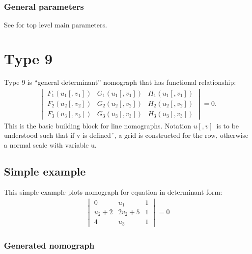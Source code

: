 \documentclass[a4paper,11pt,english]{sphinxmanual}
\begin{document}
\subsubsection{General parameters}
\label{\detokenize{types/types:id39}}
See {\hyperref[\detokenize{main_params:main-params}]{}} for top level main parameters.


\section{Type 9}
\label{\detokenize{types/types:type-9}}\label{\detokenize{types/types:type9-ref}}
Type 9 is “general determinant” nomograph that has functional
relationship:
\begin{equation*}
\begin{split}\begin{vmatrix}
F_1(u_1[,v_1])      & G_1(u_1[,v_1]) & H_1(u_1[,v_1])      \\
F_2(u_2[,v_2])      & G_2(u_2[,v_2]) & H_2(u_2[,v_2]) \\
F_3(u_3[,v_3])      & G_3(u_3[,v_3]) & H_3(u_3[,v_3])
\end{vmatrix} = 0.\end{split}
\end{equation*}
This is the basic building block for line nomographs. Notation
\(u[,v]\,\) is to be understood such that if v is defined´, a grid
is constructed for the row, otherwise a normal scale with variable u.


\subsection{Simple example}
\label{\detokenize{types/types:id40}}
This simple example plots nomograph for equation in determinant form:
\begin{equation*}
\begin{split}\begin{vmatrix}
0      & u_1 & 1      \\
u_2+2      & 2v_2+5 & 1 \\
4      & u_3 & 1 \end{vmatrix} = 0\end{split}
\end{equation*}

\subsubsection{Generated nomograph}
\label{\detokenize{types/types:id41}}
\noindent{}
\end{document}
